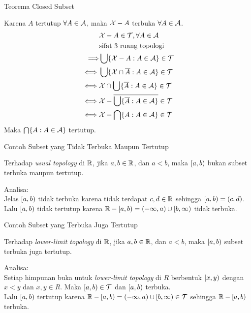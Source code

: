 \begin{frame}{Teorema Closed Subset}
    \begin{tcolorbox}[enhanced,title=Teorema 1.18 (Bukti), frame style tile={width=\paperwidth}{\wallpaper}]
        Karena $A$ tertutup $\forall A \in \mathcal{A}$, maka $\mathcal{X}-A$ terbuka $\forall A\in \mathcal{A}$.
        \begin{align*}
            &\mathcal{X}-A \in \mathcal{T}, \forall A\in \mathcal{A}\\
            &\text{sifat 3 ruang topologi}\\
            \Longrightarrow& \bigcup\{\mathcal{X}-A: A\in \mathcal{A}\}\in \mathcal{T}\\
            \iff &\bigcup\{\mathcal{X}\cap \overline{A}:A\in\mathcal{A}\}\in \mathcal{T}\\
            \iff &\mathcal{X}\cap\bigcup\{\overline{A}:A\in\mathcal{A}\}\in \mathcal{T}\\
            \iff &\mathcal{X}-\overline{\bigcup\{\overline{A}:A\in\mathcal{A}\}}\in \mathcal{T}\\
            \iff &\mathcal{X}-\bigcap\{A:A\in\mathcal{A}\}\in \mathcal{T}
        \end{align*}
        Maka $\bigcap\{A:A\in\mathcal{A}\}$ tertutup.
    \end{tcolorbox}
\end{frame}

\begin{frame}{Contoh Subset yang Tidak Terbuka Maupun Tertutup}
    \begin{tcolorbox}[enhanced,title=Contoh 40(a), frame style tile={width=\paperwidth}{\wallpaper}]
        Terhadap \textit{usual topology} di $\mathbb{R}$, jika $a,b\in\mathbb{R}$, dan $a<b$,
        maka $[a,b)$ bukan subset terbuka maupun tertutup.
    \end{tcolorbox}
    Analisa:\\
    Jelas $[a,b)$ tidak terbuka karena tidak terdapat $c,d\in\mathbb{R}$ sehingga
    $[a,b) = (c,d)$.\\
    Lalu $[a,b)$ tidak tertutup karena $\mathbb{R}-[a,b) = (-\infty,a)\cup[b,\infty)$ 
    tidak terbuka.
\end{frame}

\begin{frame}{Contoh Subset yang Terbuka Juga Tertutup}
    \begin{tcolorbox}[enhanced,title=Contoh 40(b), frame style tile={width=\paperwidth}{\wallpaper}]
        Terhadap \textit{lower-limit topology} di $\mathbb{R}$, jika $a,b\in\mathbb{R}$, dan $a<b$,
        maka $[a,b)$ subset terbuka juga tertutup.
    \end{tcolorbox}
    Analisa:\\
    Setiap himpunan buka untuk \textit{lower-limit topology} di $R$ berbentuk $[x,y)$
    dengan $x < y$ dan $x,y\in R$. Maka $[a,b)\in \mathcal{T}$ dan $[a,b)$ terbuka.\\
    Lalu $[a,b)$ tertutup karena $\mathbb{R}-[a,b) = (-\infty,a)\cup[b,\infty)\in\mathcal{T}$ 
    sehingga $\mathbb{R}-[a,b)$ terbuka.
\end{frame}

